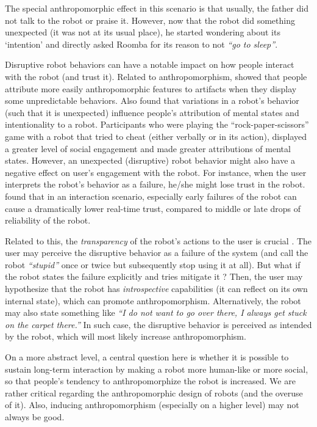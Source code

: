 \documentclass{frontiersSCNS} %
\begin{document}
The special anthropomorphic effect in this scenario is that usually, the father did not talk to the robot or praise it. However, now that the robot did something unexpected (it was not at its usual place), he started wondering about its `intention' and directly asked Roomba for its reason to not \textit{``go to sleep''}.

Disruptive robot behaviors can have a notable impact on how people interact with the robot (and trust it). Related to anthropomorphism, \cite{Waytz2010} showed that people attribute more easily anthropomorphic features to artifacts when they display some unpredictable behaviors. Also \cite{short_no_2010} found that variations in a robot's behavior (such that it is unexpected) influence people's attribution of mental states and intentionality to a robot. Participants who were playing the ``rock-paper-scissors'' game with a robot that tried to cheat (either verbally or in its action), displayed a greater level of social engagement and made greater attributions of mental states.
However, an unexpected (disruptive) robot behavior might also have a negative effect on user's engagement with the robot. For instance, when the user interprets the robot's behavior as a failure, he/she might lose trust in the robot. \cite{desai_impact_2013} found that in an interaction scenario, especially early failures of the robot can cause a dramatically lower real-time trust, compared to middle or late drops of reliability of the robot.

Related to this, the \textit{transparency} of the robot's actions to the user is crucial \citep{kim_who_2006}. The user may perceive the disruptive behavior as a failure of the system (and call the robot \textit{``stupid''} once or twice but subsequently stop using it at all). But what if the robot states the failure explicitly and tries mitigate it \citep{lee_gracefully_2010}? Then, the user may hypothesize that the robot has \textit{introspective} capabilities (it can reflect on its own internal state), which can promote anthropomorphism. Alternatively, the robot may also state something like \textit{``I do not want to go over there, I always get stuck on the carpet there.''} In such case, the disruptive behavior is perceived as intended by the robot, which will most likely increase anthropomorphism. 
 
On a more abstract level, a central question here is whether it is possible to sustain long-term interaction by making a robot more human-like or more social, so that people's tendency to anthropomorphize the robot is increased. We are rather critical regarding the anthropomorphic design of robots (and the overuse of it). Also, inducing anthropomorphism (especially on a higher level) may not always be good.
\end{document}
